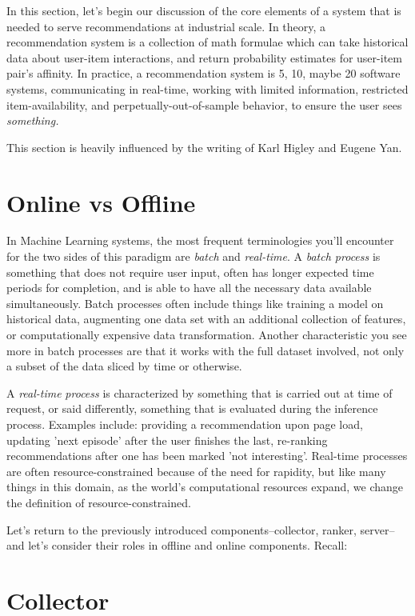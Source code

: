 

In this section, let's begin our discussion of the core elements of a system that is needed to serve recommendations at industrial scale. In theory, a recommendation system is a collection of math formulae which can take historical data about user-item interactions, and return probability estimates for user-item pair's affinity. In practice, a recommendation system is 5, 10, maybe 20 software systems, communicating in real-time, working with limited information, restricted item-availability, and perpetually-out-of-sample behavior, to ensure the user sees \textit{something.}

This section is heavily influenced by the writing of Karl Higley and Eugene Yan.

\section{Online vs Offline}

In Machine Learning systems, the most frequent terminologies you'll encounter for the two sides of this paradigm are \emph{batch} and \emph{real-time}.
A \emph{batch process} is something that does not require user input, often has longer expected time periods for completion, and is able to have all the necessary data available simultaneously. Batch processes often include things like training a model on historical data, augmenting one data set with an additional collection of features, or computationally expensive data transformation. Another characteristic you see more in batch processes are that it works with the full dataset involved, not only a subset of the data sliced by time or otherwise.

A \emph{real-time} \emph{process} is characterized by something that is carried out at time of request, or said differently, something that is evaluated during the inference process. Examples include: providing a recommendation upon page load, updating 'next episode' after the user finishes the last, re-ranking recommendations after one has been marked 'not interesting'. Real-time processes are often resource-constrained because of the need for rapidity, but like many things in this domain, as the world's computational resources expand, we change the definition of resource-constrained.

Let's return to the previously introduced components–collector, ranker, server–and let's consider their roles in offline and online components. Recall:

\section{Collector}

